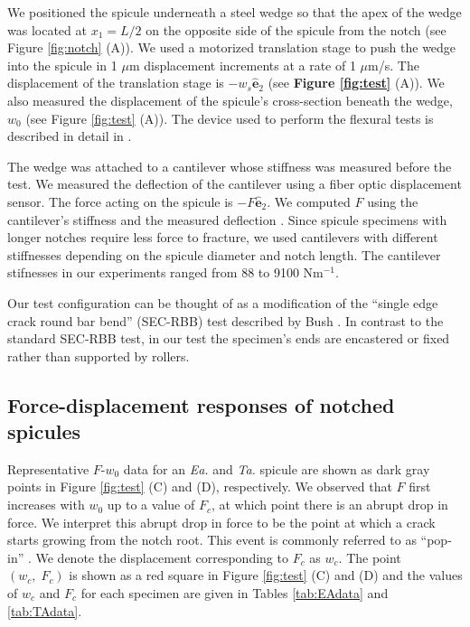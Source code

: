 \documentclass[12pt,onecolumn]{article}
\makeatletter
\newcommand{\ey}{{\bm{\hat{e}}}_2}
\newcommand{\TA}{\textit{Ta.\@}\xspace}
\newcommand{\EA}{\textit{Ea.\@}\xspace}
\makeatother
\begin{document}
\begin{bibunit}
We positioned the spicule underneath a steel wedge so that the apex of the wedge was located at $x_1=L/2$ on the opposite side of the spicule from the notch (see Figure \ref{fig:notch} (A)). We used a motorized translation stage to push the wedge into the spicule in 1 $\mu$m displacement increments at a rate of 1 $\mu$m/s. The displacement of the translation stage is $-w_s\ey$ (see {\bf Figure \ref{fig:test}} (A)). We also measured the displacement of the spicule's cross-section beneath the wedge, $w_0$ (see Figure \ref{fig:test} (A)). The device used to perform the flexural tests is described in detail in \cite{monn2017enhanced,monn2017millimeter}.

The wedge was attached to a cantilever whose stiffness was measured before the test. We measured the deflection of the cantilever using a fiber optic displacement sensor. The force acting on the spicule is $-F\ey$. We computed $F$ using the cantilever's stiffness and the measured deflection \cite{monn2017enhanced}. Since spicule specimens with longer notches require less force to fracture, we used cantilevers with different stiffnesses depending on the spicule diameter and notch length. The cantilever stifnesses in our experiments ranged from 88 to 9100 Nm$^{-1}$.

Our test configuration can be thought of as a modification of the ``single edge crack round bar bend'' (SEC-RBB) test described by Bush \cite{bush1976experimentally}. In contrast to the standard SEC-RBB test, in our test the specimen's ends are encastered or fixed rather than supported by rollers.

\subsection{Force-displacement responses of notched spicules}
\label{sec:fdresp}
Representative $F$-$w_0$ data for an \EA and \TA spicule are shown as dark gray points in Figure \ref{fig:test} (C) and (D), respectively. We observed that $F$ first increases with $w_0$ up to a value of $F_c$, at which point there is an abrupt drop in force. We interpret this abrupt drop in force to be the point at which a crack starts growing from the notch root. This event is commonly referred to as ``pop-in'' \cite{paris1965fracture,jaya2014crack}. We denote the displacement corresponding to $F_c$ as $w_c$. The point $(w_c, \; F_c)$ is shown as a red square in Figure \ref{fig:test} (C) and (D) and the values of $w_c$ and $F_c$ for each specimen are given in Tables \ref{tab:EAdata} and \ref{tab:TAdata}. 


\end{bibunit}
\end{document}
